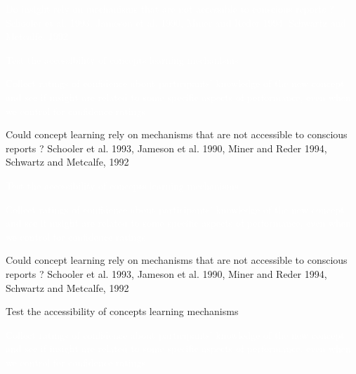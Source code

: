 \documentclass[11pt]{beamer}
\begin{document}
                 \begin{frame}

                   \textcolor{white}{ Do insight rely on mechanisms that are not accessible to conscious reports ? \footnotesize{Schooler et al. 1993,  Jameson et al. 1990, Miner and Reder 1994, Schwartz and Metcalfe, 1992}}

                   \normalsize

                   \textcolor{white}{ Test the accessibility of concepts learning mechanisms}

                   \textcolor{white}{Collect ratings of confidence about participants' knowledge of the new concept and see if insight are related to some specific aspects of performance, even when we control for confidence ratings}
  

                 \end{frame}


                 
                 \begin{frame}

                   Could concept learning rely on mechanisms that are not accessible to conscious reports ? \footnotesize{Schooler et al. 1993,  Jameson et al. 1990, Miner and Reder 1994, Schwartz and Metcalfe, 1992}

                   \normalsize

                   \textcolor{white}{Test the accessibility of concepts learning mechanisms}
                   
                   \textcolor{white}{Collect ratings of confidence about participants' knowledge of the new concept and see if insight are related to some specific aspects of performance, even when we control for confidence ratings}
  
                 
                 \end{frame}


                 \begin{frame}

                   Could concept learning rely on mechanisms that are not accessible to conscious reports ? \footnotesize{Schooler et al. 1993,  Jameson et al. 1990, Miner and Reder 1994, Schwartz and Metcalfe, 1992}


                   \normalsize
                   
                   Test the accessibility of concepts learning mechanisms

                   \textcolor{white}{Collect ratings of confidence about participants' knowledge of the new concept and see if insight are related to some specific aspects of performance, even when we control for confidence ratings}
  

                 \end{frame}
\end{document}
